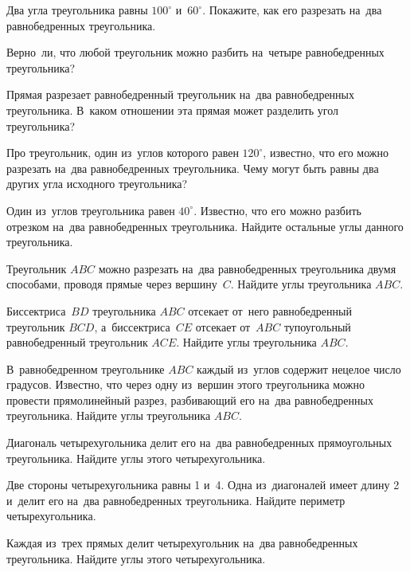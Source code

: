 



\begin{problems}

\item
Два угла треугольника равны $100^\circ$ и~$60^\circ$.
Покажите, как его разрезать на~два равнобедренных треугольника.

\item
Верно~ли, что любой треугольник можно разбить на~четыре равнобедренных
треугольника?

\item
Прямая разрезает равнобедренный треугольник на~два равнобедренных треугольника.
В~каком отношении эта прямая может разделить угол треугольника?

\item
Про треугольник, один из~углов которого равен $120^\circ$, известно, что его
можно разрезать на~два равнобедренных треугольника.
Чему могут быть равны два других угла исходного треугольника?

\item
Один из~углов треугольника равен $40^\circ$.
Известно, что его можно разбить отрезком на~два равнобедренных треугольника.
Найдите остальные углы данного треугольника.

\item
Треугольник $ABC$ можно разрезать на~два равнобедренных треугольника двумя
способами, проводя прямые через вершину~$C$.
Найдите углы треугольника $ABC$.

\item
Биссектриса~$BD$ треугольника $ABC$ отсекает от~него равнобедренный
треугольник $BCD$, а~биссектриса~$CE$ отсекает от~$ABC$ тупоугольный
равнобедренный треугольник $ACE$.
Найдите углы треугольника $ABC$.

\item
В~равнобедренном треугольнике $ABC$ каждый из~углов содержит нецелое число
градусов.
Известно, что через одну из~вершин этого треугольника можно провести
прямолинейный разрез, разбивающий его на~два равнобедренных треугольника.
Найдите углы треугольника $ABC$.

\item
Диагональ четырехугольника делит его на~два равнобедренных прямоугольных
треугольника.
Найдите углы этого четырехугольника.

\item
Две стороны четырехугольника равны 1 и~4.
Одна из~диагоналей имеет длину 2 и~делит его на~два равнобедренных
треугольника.
Найдите периметр четырехугольника.

\item
Каждая из~трех прямых делит четырехугольник на~два равнобедренных треугольника.
Найдите углы этого четырехугольника.

\end{problems}


